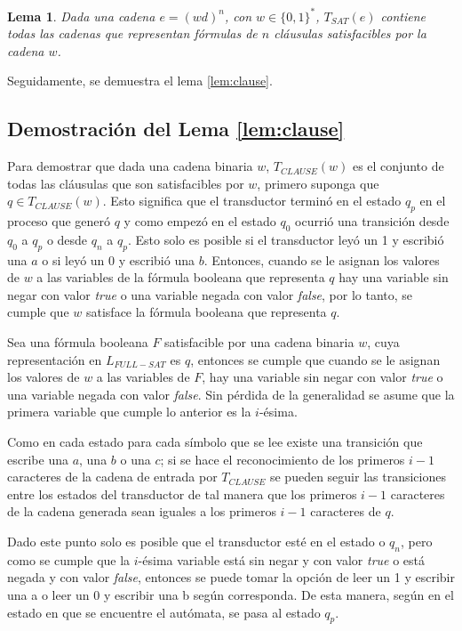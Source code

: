 \documentclass[12pt]{article}
\newtheorem{lemma}{Lema}
\newcommand{\true}{\textit{true}}
\newcommand{\false}{\textit{false}}
\begin{document}
\begin{lemma}
    \label{lem:sat}
    Dada una cadena $e=(wd)^n$, con $w\in\{0,1\}^*$, $T_{SAT}(e)$ contiene todas las cadenas que representan fórmulas de $n$ cláusulas satisfacibles por la cadena $w$.
\end{lemma}


Seguidamente, se demuestra el lema \ref{lem:clause}.

\subsection{Demostración del Lema \ref{lem:clause}}

Para demostrar que dada una cadena binaria $w$, $T_{CLAUSE}(w)$ es el conjunto de todas las cláusulas que son 
satisfacibles por $w$, primero suponga que $q\in T_{CLAUSE}(w)$.  Esto significa que el transductor terminó en 
el estado $q_p$ en el proceso que generó $q$ y como empezó en el estado $q_0$ ocurrió una transición desde 
$q_0$ a $q_p$ o desde $q_n$ a $q_p$. Esto solo es posible si el transductor leyó un 1 y escribió una $a$ o si leyó un 0 y 
escribió una $b$. Entonces, cuando se le asignan los valores de $w$ a las variables de la fórmula booleana que 
representa $q$ hay una variable sin negar con valor \true{} o una variable negada con valor \false{}, por lo tanto, 
se cumple que $w$ satisface la fórmula booleana que representa $q$.

Sea una fórmula booleana $F$ satisfacible por una cadena binaria $w$, cuya representación en $L_{FULL-SAT}$ es $q$, entonces se cumple que 
cuando se le asignan los valores de $w$ a las variables de $F$, hay una variable sin negar con valor \true{} o una variable negada con valor \false{}. Sin pérdida de la generalidad se asume que la primera variable que cumple 
lo anterior es la $i$-ésima.  

Como en cada estado para cada símbolo que se lee existe una transición que escribe una $a$, una $b$ o una $c$;
si se hace el reconocimiento de los primeros $i-1$ caracteres de la cadena de entrada por $T_{CLAUSE}$
se pueden seguir las transiciones entre los estados del transductor de tal manera que los primeros $i-1$
caracteres de la cadena generada sean iguales a los primeros $i-1$ caracteres de $q$. 

Dado este punto solo es posible que el transductor esté en el estado  o $q_n$, pero como se cumple que la $i$-ésima variable está sin negar y con valor \true{} o está negada y con valor \false{}, entonces se puede tomar la opción de leer un 1 y escribir una a o leer un 0 y escribir una b según corresponda.  De esta manera, según en el estado en que se encuentre el autómata, se pasa al estado $q_p$.
\end{document}
